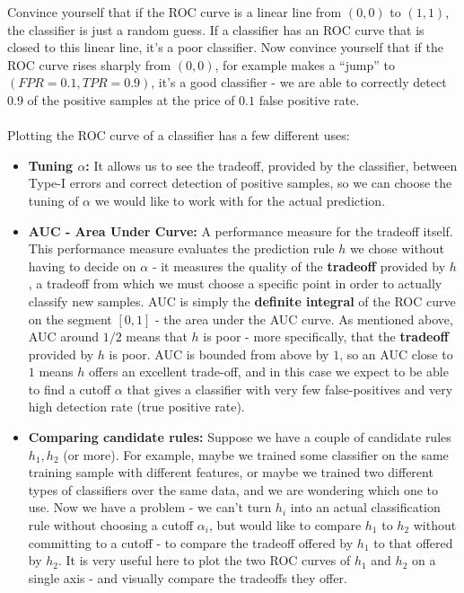 Convince yourself that if the ROC curve is a linear line from $(0,0)$ to $(1,1)$, the classifier is just a random guess. If a classifier has an ROC curve that is closed to this linear line, it's a poor classifier. Now convince yourself that if the ROC curve rises sharply from $(0,0)$, for example makes a ``jump'' to $(FPR=0.1, TPR=0.9)$, it's a good classifier - we are able to correctly detect $0.9$ of the positive samples at the price of $0.1$ false positive rate. 
\\~\\
Plotting the ROC curve of a classifier has a few different uses:
\begin{itemize}
\item \textbf{Tuning $\alpha$:} It allows us to see the tradeoff, provided by the classifier, between Type-I errors and correct detection of positive samples, so we can choose the tuning of $\alpha$ we would like to work with for the actual prediction.
\item \textbf{AUC - Area Under Curve:} A performance measure for the tradeoff itself. This performance measure evaluates the prediction rule $h$ we chose without having to decide on $\alpha$ - it measures the quality of the \textbf{tradeoff} provided by $h$, a tradeoff from which we must choose a specific point in order to actually classify new samples. AUC is simply the \textbf{definite integral} of the ROC curve on the segment $[0,1]$ - the area under the AUC curve. As mentioned above, AUC around $1/2$ means that $h$ is poor - more specifically, that the \textbf{tradeoff} provided by $h$ is poor. AUC is bounded from above by $1$, so an AUC close to $1$ means $h$ offers an excellent trade-off, and in this case we expect to be able to find a cutoff $\alpha$ that gives a classifier with very few false-positives and very high detection rate (true positive rate).
\item \textbf{Comparing candidate rules:} Suppose we have a couple of candidate rules $h_1,h_2$ (or more). For example, maybe we trained some classifier on the same training sample with different features, or maybe we trained two different types of classifiers over the same data, and we are wondering which one to use. Now we have a problem - we can't turn $h_i$ into an actual classification rule without choosing a cutoff $\alpha_i$, but would like to compare $h_1$ to $h_2$ without committing to a cutoff - to compare the tradeoff offered by $h_1$ to that offered by $h_2$. It is very useful here to plot the two ROC curves of $h_1$ and $h_2$ on a single axis - and visually compare the tradeoffs they offer. 
\end{itemize}



